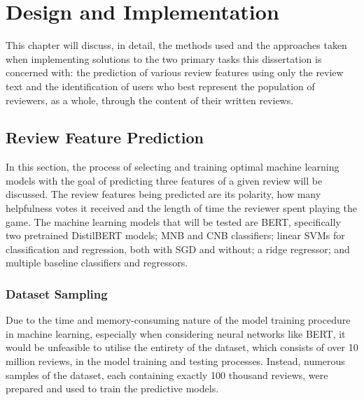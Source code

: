 \chapter{Design and Implementation} \label{sec:DI}

This chapter will discuss, in detail, the methods used and the approaches taken when implementing solutions to the two primary tasks this dissertation is concerned with: the prediction of various review features using only the review text and the identification of users who best represent the population of reviewers, as a whole, through the content of their written reviews.

\section{Review Feature Prediction} \label{sec:DI_RF}

In this section, the process of selecting and training optimal machine learning models with the goal of predicting three features of a given review will be discussed. The review features being predicted are its polarity, how many helpfulness votes it received and the length of time the reviewer spent playing the game. The machine learning models that will be tested are BERT, specifically two pretrained DistilBERT models; MNB and CNB classifiers; linear SVMs for classification and regression, both with SGD and without; a ridge regressor; and multiple baseline classifiers and regressors.

\subsection{Dataset Sampling} \label{sec:DI_RF_Sampling}

Due to the time and memory-consuming nature of the model training procedure in machine learning, especially when considering neural networks like BERT, it would be unfeasible to utilise the entirety of the dataset, which consists of over 10 million reviews, in the model training and testing processes. Instead, numerous samples of the dataset, each containing exactly 100 thousand reviews, were prepared and used to train the predictive models.

